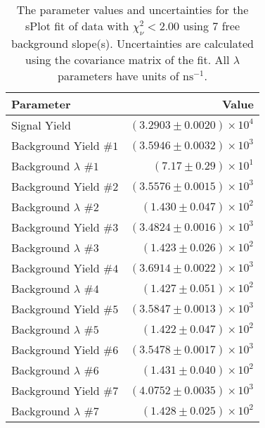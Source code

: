 
\begin{table}
    \begin{center}
        \begin{tabular}{lr}\toprule
            Parameter & Value \\\midrule
            Signal Yield & $(3.2903 \pm 0.0020) \times 10^{4}$ \\
            Background Yield $\#1$ & $(3.5946 \pm 0.0032) \times 10^{3}$ \\
            Background $\lambda$ $\#1$ & $(7.17 \pm 0.29) \times 10^{1}$ \\
            Background Yield $\#2$ & $(3.5576 \pm 0.0015) \times 10^{3}$ \\
            Background $\lambda$ $\#2$ & $(1.430 \pm 0.047) \times 10^{2}$ \\
            Background Yield $\#3$ & $(3.4824 \pm 0.0016) \times 10^{3}$ \\
            Background $\lambda$ $\#3$ & $(1.423 \pm 0.026) \times 10^{2}$ \\
            Background Yield $\#4$ & $(3.6914 \pm 0.0022) \times 10^{3}$ \\
            Background $\lambda$ $\#4$ & $(1.427 \pm 0.051) \times 10^{2}$ \\
            Background Yield $\#5$ & $(3.5847 \pm 0.0013) \times 10^{3}$ \\
            Background $\lambda$ $\#5$ & $(1.422 \pm 0.047) \times 10^{2}$ \\
            Background Yield $\#6$ & $(3.5478 \pm 0.0017) \times 10^{3}$ \\
            Background $\lambda$ $\#6$ & $(1.431 \pm 0.040) \times 10^{2}$ \\
            Background Yield $\#7$ & $(4.0752 \pm 0.0035) \times 10^{3}$ \\
            Background $\lambda$ $\#7$ & $(1.428 \pm 0.025) \times 10^{2}$ \\\bottomrule
        \end{tabular}
        \caption{The parameter values and uncertainties for the sPlot fit of data with $\chi^2_\nu < 2.00$ using 7 free background slope(s). Uncertainties are calculated using the covariance matrix of the fit. All $\lambda$ parameters have units of $\si{\nano\second}^{-1}$.}
    \end{center}
\end{table}

